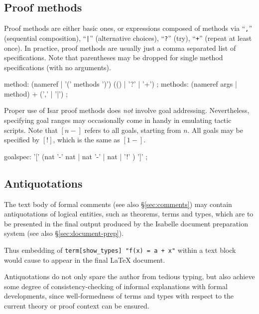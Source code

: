 \subsection{Proof methods}\label{sec:syn-meth}

Proof methods are either basic ones, or expressions composed of methods via
``\texttt{,}'' (sequential composition), ``\texttt{|}'' (alternative choices),
``\texttt{?}'' (try), ``\texttt{+}'' (repeat at least once).  In practice,
proof methods are usually just a comma separated list of
~ specifications.  Note that parentheses
may be dropped for single method specifications (with no arguments).

\begin{rail}
  method: (nameref | '(' methods ')') (() | '?' | '+')
  ;
  methods: (nameref args | method) + (',' | '|')
  ;
\end{rail}

Proper use of Isar proof methods does \emph{not} involve goal addressing.
Nevertheless, specifying goal ranges may occasionally come in handy in
emulating tactic scripts.  Note that $[n-]$ refers to all goals, starting from
$n$.  All goals may be specified by $[!]$, which is the same as $[1-]$.

\begin{rail}
  goalspec: '[' (nat '-' nat | nat '-' | nat | '!' ) ']'
  ;
\end{rail}


\subsection{Antiquotations}\label{sec:antiq}

The text body of formal comments (see also \S\ref{sec:comments}) may contain
antiquotations of logical entities, such as theorems, terms and types, which
are to be presented in the final output produced by the Isabelle document
preparation system (see also \S\ref{sec:document-prep}).

Thus embedding of
\texttt{{\at}{\ttlbrace}term[show_types]~"f(x)~=~a~+~x"{\ttrbrace}} within a
text block would cause
to appear in the final {\LaTeX} document.

\medskip

Antiquotations do not only spare the author from tedious typing, but also
achieve some degree of consistency-checking of informal explanations with
formal developments, since well-formedness of terms and types with respect to
the current theory or proof context can be ensured.

